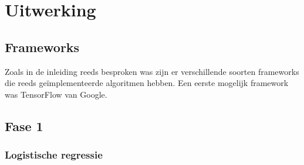
\chapter{Uitwerking}
\label{ch:uitwerking}

\section{Frameworks}
Zoals in de inleiding reeds besproken was zijn er verschillende soorten frameworks die reeds geïmplementeerde algoritmen hebben. Een eerste mogelijk framework was TensorFlow van Google. 


\section{Fase 1}
\label{sec:Fase1}


\subsection{Logistische regressie}
\label{sec:Logistische regressie-fase1}
